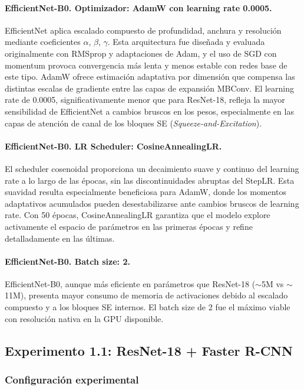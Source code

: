 \paragraph{EfficientNet-B0. Optimizador: AdamW con learning rate 0.0005.}
EfficientNet aplica escalado compuesto de profundidad, anchura y resolución mediante coeficientes $\alpha$, $\beta$, $\gamma$. Esta arquitectura fue diseñada y evaluada originalmente con RMSprop y adaptaciones de Adam, y el uso de SGD con momentum provoca convergencia más lenta y menos estable con redes base de este tipo. AdamW ofrece estimación adaptativa por dimensión que compensa las distintas escalas de gradiente entre las capas de expansión MBConv. El learning rate de 0.0005, significativamente menor que para ResNet-18, refleja la mayor sensibilidad de EfficientNet a cambios bruscos en los pesos, especialmente en las capas de atención de canal de los bloques SE (\textit{Squeeze-and-Excitation}).

\paragraph{EfficientNet-B0. LR Scheduler: CosineAnnealingLR.}
El scheduler cosenoidal proporciona un decaimiento suave y continuo del learning rate a lo largo de las épocas, sin las discontinuidades abruptas del StepLR. Esta suavidad resulta especialmente beneficiosa para AdamW, donde los momentos adaptativos acumulados pueden desestabilizarse ante cambios bruscos de learning rate. Con 50 épocas, CosineAnnealingLR garantiza que el modelo explore activamente el espacio de parámetros en las primeras épocas y refine detalladamente en las últimas.

\paragraph{EfficientNet-B0. Batch size: 2.}
EfficientNet-B0, aunque más eficiente en parámetros que ResNet-18 ($\sim$5M vs $\sim$11M), presenta mayor consumo de memoria de activaciones debido al escalado compuesto y a los bloques SE internos. El batch size de 2 fue el máximo viable con resolución nativa en la GPU disponible.

\subsection{Experimento 1.1: ResNet-18 + Faster R-CNN}

\subsubsection{Configuración experimental}


